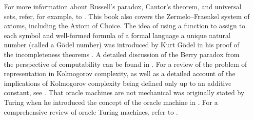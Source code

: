 For more information about Russell's paradox, Cantor's theorem, and universal sets, refer, for example, to \cite{jech2013set}. This book also covers the Zermelo–Fraenkel system of axioms, including the Axiom of Choice. The idea of using a function to assign to each symbol and well-formed formula of a formal language a unique natural number (called a Gödel number) was introduced by Kurt Gödel in his proof of the incompleteness theorems \cite{godel1931formal}. A detailed discussion of the Berry paradox from the perspective of computability can be found in \cite{chaitin1995berry}. For a review of the problem of representation in Kolmogorov complexity, as well as a detailed account of the implications of Kolmogorov complexity being defined only up to an additive constant, see \cite{li2013introduction}. That oracle machines are not mechanical was originally stated by Turing when he introduced the concept of the oracle machine in \cite{turing1939systems}. For a comprehensive review of oracle Turing machines, refer to \cite{robivc2015foundations}.
